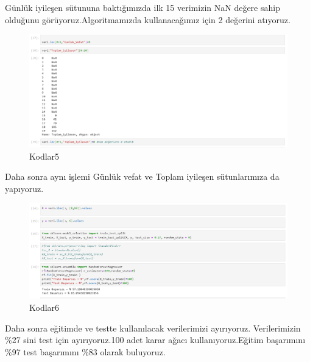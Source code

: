 \documentclass[12pt, a4paper]{article}
\begin{document}
\newpage
Günlük iyileşen sütununa baktığımızda ilk 15 verimizin NaN değere sahip olduğunu görüyoruz.Algoritmamızda kullanacağımız için 2 değerini atıyoruz.
\begin{figure}[!htbp] 
	\caption{Kodlar5}
	\centering
	\includegraphics[angle=0, width=\textwidth]{9.0.png} 
	
\end{figure}
Daha sonra aynı işlemi Günlük vefat ve Toplam iyileşen sütunlarımıza da yapıyoruz.

\begin{figure}[!htbp] 
	\caption{Kodlar6}
	\centering
	\includegraphics[angle=0, width=\textwidth]{10.0.png} 
	
\end{figure}
\newpage
Daha sonra eğitimde ve testte kullanılacak verilerimizi ayırıyoruz. Verilerimizin \%27 sini test için ayırıyoruz.100 adet karar ağacı kullanıyoruz.Eğitim başarımını \%97 test başarımını \%83 olarak buluyoruz.
\end{document}
